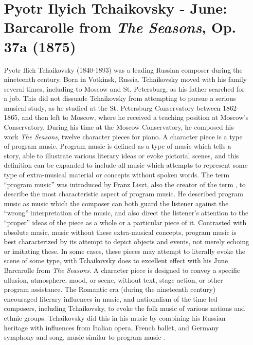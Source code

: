 \chapter[Tchaikovsky and \textit{The Seasons}, Op. 37a]{Pyotr Ilyich Tchaikovsky - June: Barcarolle from \textit{The Seasons}, Op. 37a (1875)}

Pyotr Ilich Tchaikovsky (1840-1893) was a leading Russian composer during the nineteenth century. Born in Votkinsk, Russia, Tchaikovsky moved with his family several times, including to Moscow and St. Petersburg, as his father searched for a job\autocite{Burkholder_Grout_Palisca_2014}. This did not dissuade Tchaikovsky from attempting to pursue a serious musical study, as he studied at the St. Petersburg Conservatory between 1862-1865, and then left to Moscow, where he received a teaching position at Moscow's Conservatory. During his time at the Moscow Conservatory, he composed his work \textit{The Seasons}, twelve character pieces for piano. A character piece is a type of program music. Program music is defined as a type of music which tells a story, able to illustrate various literary ideas or evoke pictorial scenes\autocite{Kennedy_Kennedy_Rutherford-Johnson_2013a}, and this definition can be expanded to include all music which attempts to represent some type of extra-musical material or concepts without spoken words\autocite{Scruton_2001}. The term ``program music'' was introduced by Franz Liszt, also the creator of the term , to describe the most characteristic aspect of program music. He described program music as music which the composer can both guard the listener against the ``wrong'' interpretation of the music, and also direct the listener's attention to the ``proper'' ideas of the piece as a whole or a particular piece of it. Contrasted with absolute music, music without these extra-musical concepts, program music is best characterized by its attempt to depict objects and events, not merely echoing or imitating these. In some cases, these pieces may attempt to literally evoke the scene of some type, with Tchaikovsky does to excellent effect with his June Barcarolle from \textit{The Seasons}. A character piece is designed to convey a specific allusion, atmosphere, mood, or scene, without text, stage action, or other program assistance\autocite{Temperley_2011}. The Romantic era (during the nineteenth century) encouraged literary influences in music, and nationalism of the time led composers, including Tchaikovsky, to evoke the folk music of various nations and ethnic groups. Tchaikovsky did this in his music by combining his Russian heritage with influences from Italian opera, French ballet, and Germany symphony and song, music similar to program music \autocite{Burkholder_Grout_Palisca_2014}.

